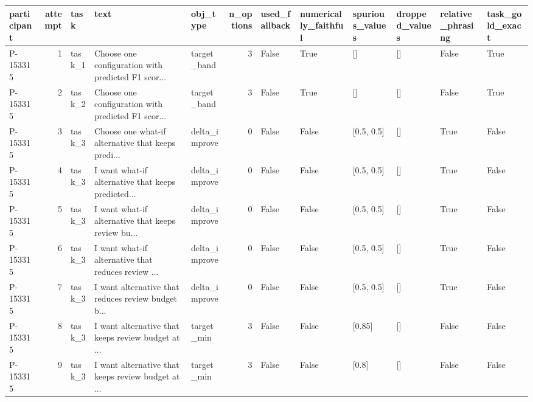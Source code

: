 \begin{tabular}{lrlllrllllll}
\toprule
participant &  attempt &   task &                                               text &      obj\_type &  n\_options &  used\_fallback &  numerically\_faithful &  spurious\_values & dropped\_values &  relative\_phrasing &  task\_gold\_exact \\
\midrule
   P-153315 &        1 & task\_1 & Choose one configuration with predicted F1 scor... &   target\_band &          3 &          False &                  True &               [] &             [] &              False &             True \\
   P-153315 &        2 & task\_2 & Choose one configuration with predicted F1 scor... &   target\_band &          3 &          False &                  True &               [] &             [] &              False &             True \\
   P-153315 &        3 & task\_3 & Choose one what-if alternative that keeps predi... & delta\_improve &          0 &          False &                 False &       [0.5, 0.5] &             [] &               True &            False \\
   P-153315 &        4 & task\_3 & I want what-if alternative that keeps predicted... & delta\_improve &          0 &          False &                 False &       [0.5, 0.5] &             [] &               True &            False \\
   P-153315 &        5 & task\_3 & I want what-if alternative that keeps review bu... & delta\_improve &          0 &          False &                 False &       [0.5, 0.5] &             [] &               True &            False \\
   P-153315 &        6 & task\_3 & I want what-if alternative that reduces review ... & delta\_improve &          0 &          False &                 False &       [0.5, 0.5] &             [] &               True &            False \\
   P-153315 &        7 & task\_3 & I want alternative that reduces review budget b... & delta\_improve &          0 &          False &                 False &       [0.5, 0.5] &             [] &               True &            False \\
   P-153315 &        8 & task\_3 & I want alternative that keeps review budget at ... &    target\_min &          3 &          False &                 False &           [0.85] &             [] &              False &            False \\
   P-153315 &        9 & task\_3 & I want alternative that keeps review budget at ... &    target\_min &          3 &          False &                 False &            [0.8] &             [] &              False &            False \\

\end{tabular}
